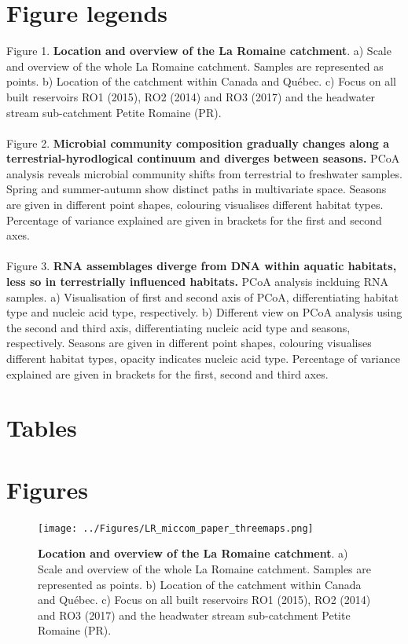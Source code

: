 \documentclass[12pt,a4paper]{article} %
\begin{document}
\section*{Figure legends}
Figure 1. \textbf{Location and overview of the La Romaine catchment}. a) Scale and overview of the whole La Romaine catchment. Samples are represented as points. b) Location of the catchment within Canada and Québec. c) Focus on all built reservoirs RO1 (2015), RO2 (2014) and RO3 (2017) and the headwater stream sub-catchment Petite Romaine (PR). \\
\\
Figure 2. \textbf{Microbial community composition gradually changes along a terrestrial-hyrodlogical continuum and diverges between seasons.} PCoA analysis reveals microbial community shifts from terrestrial to freshwater samples. Spring and summer-autumn show distinct paths in multivariate space. Seasons are given in different point shapes, colouring visualises different habitat types. Percentage of variance explained are given in brackets for the first and second axes. \\
\\
Figure 3. \textbf{RNA assemblages diverge from DNA within aquatic habitats, less so in terrestrially influenced habitats.} PCoA analysis inclduing RNA samples. a) Visualisation of first and second axis of PCoA, differentiating habitat type and nucleic acid type, respectively. b) Different view on PCoA analysis using the second and third axis, differentiating nucleic acid type and seasons, respectively. Seasons are given in different point shapes, colouring visualises different habitat types, opacity indicates nucleic acid type. Percentage of variance explained are given in brackets for the first, second and third axes.

\section*{Tables}

\newpage

\section*{Figures}
\begin{figure}[!ht]
\centering
\texttt{[image: ../Figures/LR\_miccom\_paper\_threemaps.png]}
\caption{\textbf{Location and overview of the La Romaine catchment}. a) Scale and overview of the whole La Romaine catchment. Samples are represented as points. b) Location of the catchment within Canada and Québec. c) Focus on all built reservoirs RO1 (2015), RO2 (2014) and RO3 (2017) and the headwater stream sub-catchment Petite Romaine (PR).}
\end{figure}
\end{document}
